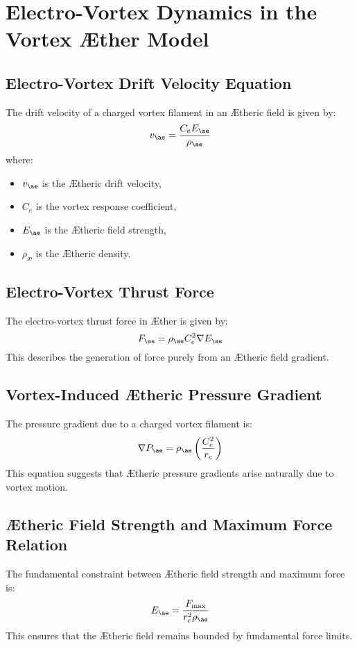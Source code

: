 \section{Electro-Vortex Dynamics in the Vortex Æther Model}

\subsection{Electro-Vortex Drift Velocity Equation}
The drift velocity of a charged vortex filament in an Ætheric field is given by:
\begin{equation}
    v_{\ae} = \frac{C_e E_{\ae}}{\rho_\text{\ae}}
\end{equation}
where:
\begin{itemize}
    \item $v_{\ae}$ is the Ætheric drift velocity,
    \item $C_e$ is the vortex response coefficient,
    \item $E_{\ae}$ is the Ætheric field strength,
    \item $\rho_\text{\ae}$ is the Ætheric density.
\end{itemize}

\subsection{Electro-Vortex Thrust Force}
The electro-vortex thrust force in Æther is given by:
\begin{equation}
    F_{\ae} = \rho_\text{\ae} C_e^2 \nabla E_{\ae}
\end{equation}
This describes the generation of force purely from an Ætheric field gradient.

\subsection{Vortex-Induced Ætheric Pressure Gradient}
The pressure gradient due to a charged vortex filament is:
\begin{equation}
    \nabla P_{\ae} = \rho_\text{\ae} \left( \frac{C_e^2}{r_c} \right)
\end{equation}
This equation suggests that Ætheric pressure gradients arise naturally due to vortex motion.

\subsection{Ætheric Field Strength and Maximum Force Relation}
The fundamental constraint between Ætheric field strength and maximum force is:
\begin{equation}
    E_{\ae} = \frac{F_{\max}}{r_c^2 \rho_\text{\ae}}
\end{equation}
This ensures that the Ætheric field remains bounded by fundamental force limits.

